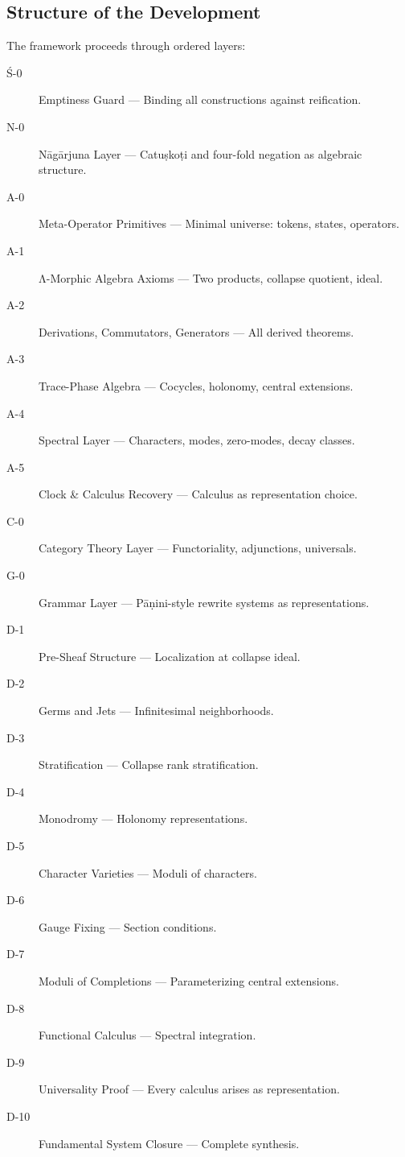 \documentclass[12pt, oneside]{article}
\begin{document}
\subsection{Structure of the Development}

The framework proceeds through ordered layers:

\begin{description}
    \item[Ś-0] Emptiness Guard — Binding all constructions against reification.
    \item[N-0] Nāgārjuna Layer — Catuṣkoṭi and four-fold negation as algebraic structure.
    \item[A-0] Meta-Operator Primitives — Minimal universe: tokens, states, operators.
    \item[A-1] Λ-Morphic Algebra Axioms — Two products, collapse quotient, ideal.
    \item[A-2] Derivations, Commutators, Generators — All derived theorems.
    \item[A-3] Trace-Phase Algebra — Cocycles, holonomy, central extensions.
    \item[A-4] Spectral Layer — Characters, modes, zero-modes, decay classes.
    \item[A-5] Clock \& Calculus Recovery — Calculus as representation choice.
    \item[C-0] Category Theory Layer — Functoriality, adjunctions, universals.
    \item[G-0] Grammar Layer — Pāṇini-style rewrite systems as representations.
    \item[D-1] Pre-Sheaf Structure — Localization at collapse ideal.
    \item[D-2] Germs and Jets — Infinitesimal neighborhoods.
    \item[D-3] Stratification — Collapse rank stratification.
    \item[D-4] Monodromy — Holonomy representations.
    \item[D-5] Character Varieties — Moduli of characters.
    \item[D-6] Gauge Fixing — Section conditions.
    \item[D-7] Moduli of Completions — Parameterizing central extensions.
    \item[D-8] Functional Calculus — Spectral integration.
    \item[D-9] Universality Proof — Every calculus arises as representation.
    \item[D-10] Fundamental System Closure — Complete synthesis.
\end{description}
\end{document}
